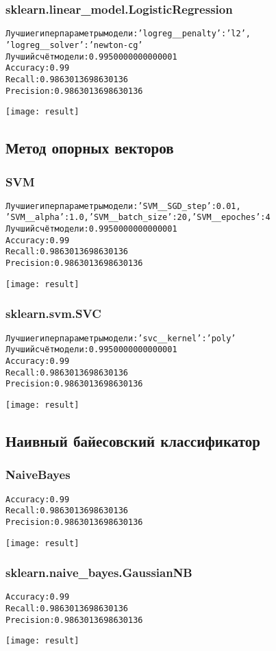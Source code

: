 \subsubsection{sklearn.linear\_model.LogisticRegression}
\begin{alltt}
Лучшие гиперпараметры модели: {'logreg__penalty': 'l2',
'logreg__solver': 'newton-cg'}
Лучший счёт модели: 0.9950000000000001
Accuracy: 0.99
Recall: 0.9863013698630136
Precision: 0.9863013698630136
\end{alltt}
\begin{center}
\texttt{[image: result]}
\end{center}
\pagebreak

\subsection{Метод опорных векторов}
\subsubsection{SVM}
\begin{alltt}
Лучшие гиперпараметры модели: {'SVM__SGD_step': 0.01,
'SVM__alpha': 1.0, 'SVM__batch_size': 20, 'SVM__epoches': 4}
Лучший счёт модели: 0.9950000000000001
Accuracy: 0.99
Recall: 0.9863013698630136
Precision: 0.9863013698630136
\end{alltt}
\begin{center}
\texttt{[image: result]}
\end{center}

\subsubsection{sklearn.svm.SVC}
\begin{alltt}
Лучшие гиперпараметры модели: {'svc__kernel': 'poly'}
Лучший счёт модели: 0.9950000000000001
Accuracy: 0.99
Recall: 0.9863013698630136
Precision: 0.9863013698630136
\end{alltt}
\begin{center}
\texttt{[image: result]}
\end{center}
\pagebreak

\subsection{Наивный байесовский классификатор}
\subsubsection{NaiveBayes}
\begin{alltt}
Accuracy: 0.99
Recall: 0.9863013698630136
Precision: 0.9863013698630136
\end{alltt}
\begin{center}
\texttt{[image: result]}
\end{center}

\subsubsection{sklearn.naive\_bayes.GaussianNB}
\begin{alltt}
Accuracy: 0.99
Recall: 0.9863013698630136
Precision: 0.9863013698630136
\end{alltt}
\begin{center}
\texttt{[image: result]}
\end{center}
\pagebreak

\pagebreak
